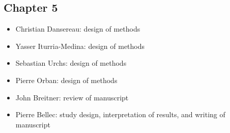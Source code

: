 \documentclass[
12pt, %
oneside, %
english, %
onehalfspacing, %
liststotoc, %
toctotoc, %
headsepline, %
consistentlayout, %
]{MastersDoctoralThesis} %
\begin{document}
\begin{contributions}
\cleardoublepage

\subsection*{Chapter 5}
\begin{itemize}
\setlength\itemsep{0em}
\item Christian Dansereau: design of methods
\item Yasser Iturria-Medina: design of methods
\item Sebastian Urchs: design of methods
\item Pierre Orban: design of methods
\item John Breitner: review of manuscript
\item Pierre Bellec: study design, interpretation of results, and writing of manuscript
\end{itemize}


\end{contributions}

\cleardoublepage






\mainmatter %

\pagestyle{thesis} %










\printbibliography[heading=bibintoc]

\end{document}
